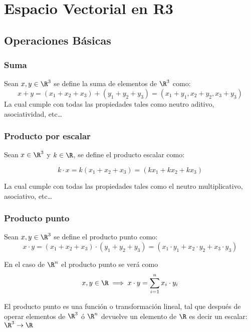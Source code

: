 \section{Espacio Vectorial en R3}

\subsection{Operaciones Básicas}

\subsubsection{Suma}
Sean $x,y\in \R^3$ se define la suma de elementos de $\R^3$ como:
\begin{equation}
	x+y=\left(x_1+x_2+x_3\right)+\left(y_1+y_2+y_3\right)= \left(x_1+y_1,x_2+y_2,x_3+y_3\right)
\end{equation}
La cual cumple con todas las propiedades tales como neutro aditivo, asociatividad, etc\dots

\subsubsection{Producto por escalar}

Sean $x\in\R^3$ y $k\in \R$, se define el producto escalar como:

\begin{equation}
	k\cdot x=k\left(x_1+x_2+x_3\right)=\left(kx_1+kx_2+kx_3\right)
\end{equation}

La cual cumple con todas las propiedades tales como el neutro multiplicativo, asociativo, etc\dots

\subsubsection{Producto punto}

Sean $x,y\in \R^3$ se define el producto punto como:
\begin{equation}
	x\cdot y=\left(x_1+x_2+x_3\right)\cdot \left(y_1+y_2+y_3\right)=\left(x_1\cdot y_1+x_2\cdot y_2+x_3\cdot y_3\right)
\end{equation}

En el caso de $\R^n$ el producto punto se verá como
\begin{equation}
	x,y\in\R\implies x\cdot y= \sum^n_{i=1} x_i\cdot y_i
\end{equation}

El producto punto es una función o transformación lineal, tal que después de operar
elementos de $\R^3$ ó $\R^n$ devuelve un elemento de $\R$
es decir un escalar: $\R^3\to \R$

